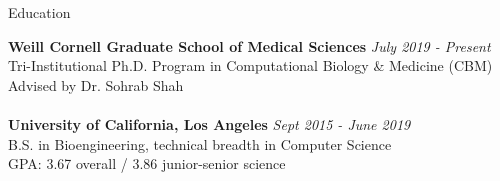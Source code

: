 \documentclass{resume} %
\begin{document}

\begin{rSection}{Education}

{\bf Weill Cornell Graduate School of Medical Sciences} \hfill {\em July 2019 - Present} 
\\ Tri-Institutional Ph.D. Program in Computational Biology \& Medicine (CBM)
\\ Advised by Dr. Sohrab Shah
\\
\\{\bf University of California, Los Angeles} \hfill {\em Sept 2015 - June 2019} 
\\ B.S. in Bioengineering, technical breadth in Computer Science
\\ GPA: 3.67 overall / 3.86 junior-senior science

\end{rSection}

\end{document}
